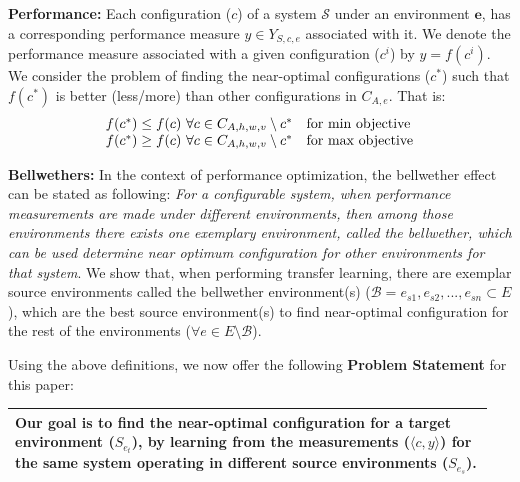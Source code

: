 \documentclass[10pt,journal,compsoc]{IEEEtran}
\begin{document}
\noindent\textbf{Performance: } 
Each configuration ($c$) of a system $\mathcal{S}$ under an environment $\mathit{\mathbf{e}}$, 
has a corresponding performance measure $y \in Y_{S,c,e}$ associated with it. 
We denote the performance 
measure associated with a given configuration ($c^i$) by $y=f(c^i)$.  We 
consider the problem of finding the near-optimal configurations ($c^{*}$) such 
that $f(c^{*})$ is better (less/more) than other configurations in $C_{A,e}$. That is:
\begin{equation*}
\centering
     {\begin{array}{*{20}{l}}
     \centering
{f(c^{*}) \le f(c){\rm{~}}\forall c \in {C_{A,h,w,v}}\setminus c^{*} }&{{\text {for min objective}}}\\
{f(c^{*}) \ge f(c){\rm{~}}\forall c \in {C_{A,h,w,v}}\setminus c^{*} }&{{\text {for max objective}}}
\end{array}}
\end{equation*}

\noindent\textbf{Bellwethers: }
In the context of performance optimization, the bellwether  effect can be stated as following: \textit{For a configurable system, when performance measurements are made 
    under 
    different environments, then
     among those environments there exists one exemplary environment, called 
    the bellwether, which can be used determine near optimum configuration for 
    other environments for that system}.
We show that, when performing transfer 
learning, there are exemplar source environments called the bellwether 
environment(s) ($\mathcal{B}={e_{s1}, e_{s2},...,e_{sn}}\subset E$), which 
are the best source environment(s) to find near-optimal configuration for the 
rest of the environments ($\forall e \in E\setminus \mathcal{B}$). 


Using the above definitions, we now offer the following  \textbf{Problem Statement} 
for this paper:\\

 
\noindent\begin{minipage}{\linewidth}
    \begin{center}
    \begin{tabular}{|p{0.95\linewidth}|}
    \hline
         \rowcolor[HTML]{FFFFFF}
        Our goal is to find the near-optimal 
configuration for a target environment ($S_{e_t}$), by learning from the measurements ($\langle c,y\rangle$) for the same system operating in different source environments ($S_{e_s}$). 
\\\hline
    \end{tabular}
    \end{center}
\end{minipage}
\vspace{1mm} 
\end{document}
